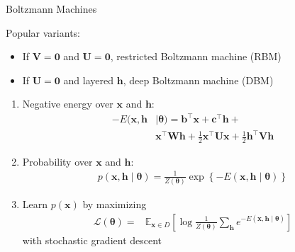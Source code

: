 \documentclass{beamer}
\newcommand{\vect}[1]{\mathbf{#1}}
\newcommand{\vects}[1]{\boldsymbol{#1}}
\newcommand{\matr}[1]{\mathbf{#1}}
\newcommand{\vb}[0]{\vect{b}}
\newcommand{\vc}[0]{\vect{c}}
\newcommand{\vh}[0]{\vect{h}}
\newcommand{\vx}[0]{\vect{x}}
\newcommand{\mW}[0]{\matr{W}}
\newcommand{\mU}[0]{\matr{U}}
\newcommand{\mV}[0]{\matr{V}}
\newcommand{\mzero}[0]{\matr{0}}
\newcommand{\TT}[0]{{\vects{\theta}}}
\newcommand{\LL}[0]{\mathcal{L}}
\newcommand{\E}[0]{\mathbb{E}}
\begin{document}
\begin{frame}{Boltzmann Machines}
\begin{minipage}{0.33\textwidth}
        \begin{minipage}{\columnwidth}
            \small 
            Popular variants:
            \begin{itemize}
                \item If $\mV=\mzero$ and $\mU=\mzero$, restricted Boltzmann
                    machine (RBM)
                \item If $\mU=\mzero$ and layered $\vh$, deep Boltzmann
                    machine (DBM)
            \end{itemize} 
        \end{minipage}
    \end{minipage}
    \hfill
    \begin{minipage}{0.65\textwidth}
        \small
        \begin{enumerate}
            \item Negative energy over $\vx$ and $\vh$:
                \begin{align*}
                -E(\vx, \vh &\mid \TT) = \vb^\top \vx +
                \vc^\top \vh + \\
                &
                \vx^\top \mW \vh + \frac{1}{2} \vx^\top \mU \vx +
                \frac{1}{2} \vh^\top \mV \vh
            \end{align*}
            \item Probability over $\vx$ and
                $\vh$:
                \begin{align*}
                p(\vx, \vh \mid \TT) = \frac{1}{Z(\TT)} \exp \left\{
                -E\left(\vx , \vh \mid \TT\right)
                \right\}
            \end{align*}
            \item Learn $p(\vx)$ by maximizing
                \begin{align*}
                    \LL(\TT) =& \E_{\vx \in D} \left[ \log
                    \frac{1}{Z(\TT)} \sum_{\vh}
                    e^{-E\left( \vx, \vh \mid \TT\right)}
    \right]
            \end{align*}
            with stochastic gradient descent
        \end{enumerate}
    \end{minipage}
\end{frame}
\end{document}
